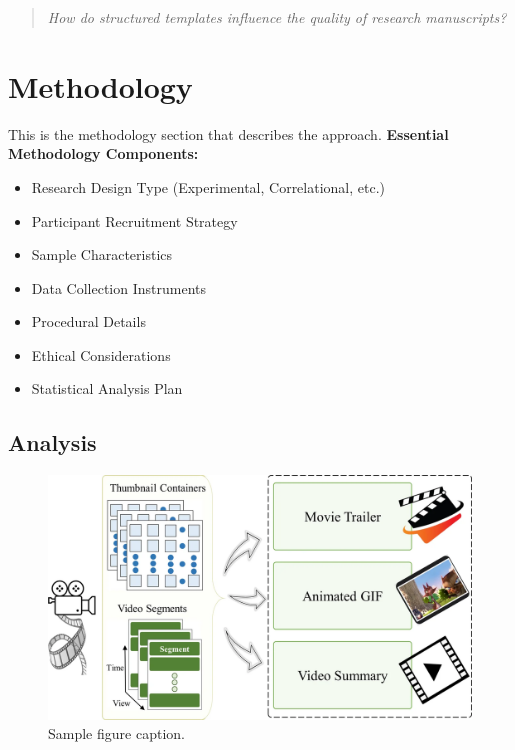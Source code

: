 \documentclass[stu,12pt,floatsintext]{apa7}
\begin{document}
\begin{quote}
\textit{How do structured templates influence the quality of research manuscripts?}
\end{quote}

\section{Methodology}
This is the methodology section that describes the approach.
\textbf{Essential Methodology Components:}
\begin{itemize}
    \item Research Design Type (Experimental, Correlational, etc.)
    \item Participant Recruitment Strategy
    \item Sample Characteristics
    \item Data Collection Instruments
    \item Procedural Details
    \item Ethical Considerations
    \item Statistical Analysis Plan
\end{itemize}

\subsection{Analysis}

\begin{figure}[ht]
    \centering
    \includegraphics[width=0.75\linewidth]{figures/sample_img.png}
    \caption{Sample figure caption.}
    \label{fig:writing_scores}
\end{figure}
\end{document}
